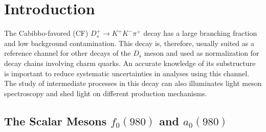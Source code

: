 \section{Introduction}
The Cabibbo-favored (CF) $D_{s}^{+} \rightarrow K^{+}K^{-}\pi^{+}$ decay has a large branching fraction and low background contamination.
This decay is, therefore, usually suited as a reference channel for other decays of the $D_{s}$ meson and used as normalization for decay chains involving charm quarks.
An accurate knowledge of its substructure is important to reduce systematic uncertainties in analyses using this channel.
The study of intermediate processes in this decay can also illuminates light meson spectroscopy and shed light on different production mechanisms.
\subsection{The Scalar Mesons $f_{0}(980)$ and $a_{0}(980)$}
\label{f0-a0-discussion}
